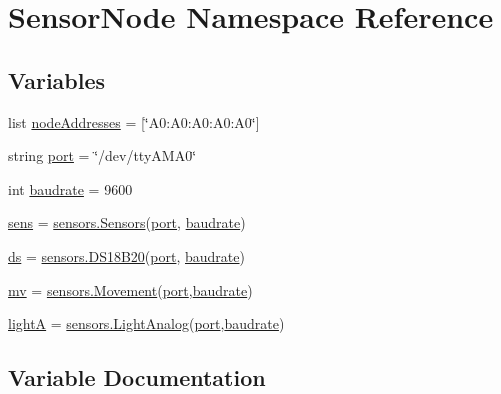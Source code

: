 \hypertarget{namespaceSensorNode}{}\section{Sensor\+Node Namespace Reference}
\label{namespaceSensorNode}
\subsection*{Variables}
\begin{DoxyCompactItemize}
\item 
list \hyperlink{namespaceSensorNode_ac1e752b62092c1c9e27da570c73c0ce7}{node\+Addresses} = \mbox{[}\char`\"{}A0\+:\+A0\+:\+A0\+:\+A0\+:\+A0\char`\"{}\mbox{]}
\item 
string \hyperlink{namespaceSensorNode_a1a9ff3aa5a94fc55ff0fa24862db071b}{port} = \char`\"{}/dev/tty\+A\+M\+A0\char`\"{}
\item 
int \hyperlink{namespaceSensorNode_a50365066340e665ac5f274dfb3a7ae82}{baudrate} = 9600
\item 
\hyperlink{namespaceSensorNode_a341717027383e08a67cc397e2d00a99e}{sens} = \hyperlink{classsensors_1_1Sensors}{sensors.\+Sensors}(\hyperlink{namespaceSensorNode_a1a9ff3aa5a94fc55ff0fa24862db071b}{port}, \hyperlink{namespaceSensorNode_a50365066340e665ac5f274dfb3a7ae82}{baudrate})
\item 
\hyperlink{namespaceSensorNode_aaa177ea377a1a6a4ae0b9426064e940d}{ds} = \hyperlink{classsensors_1_1DS18B20}{sensors.\+D\+S18\+B20}(\hyperlink{namespaceSensorNode_a1a9ff3aa5a94fc55ff0fa24862db071b}{port}, \hyperlink{namespaceSensorNode_a50365066340e665ac5f274dfb3a7ae82}{baudrate})
\item 
\hyperlink{namespaceSensorNode_ad06784c1a82686d5c2d6908f088c16f6}{mv} = \hyperlink{classsensors_1_1Movement}{sensors.\+Movement}(\hyperlink{namespaceSensorNode_a1a9ff3aa5a94fc55ff0fa24862db071b}{port},\hyperlink{namespaceSensorNode_a50365066340e665ac5f274dfb3a7ae82}{baudrate})
\item 
\hyperlink{namespaceSensorNode_a973908ebd2519a83b199d68f97f31a3f}{lightA} = \hyperlink{classsensors_1_1LightAnalog}{sensors.\+Light\+Analog}(\hyperlink{namespaceSensorNode_a1a9ff3aa5a94fc55ff0fa24862db071b}{port},\hyperlink{namespaceSensorNode_a50365066340e665ac5f274dfb3a7ae82}{baudrate})
\end{DoxyCompactItemize}


\subsection{Variable Documentation}
